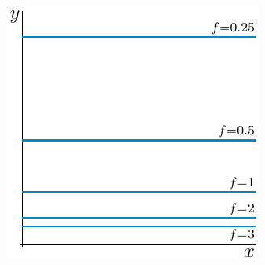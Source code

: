 \begin{answer}
\begin{center}
  \includegraphics{fig/hyperCylinderLevel.pdf}
\end{center}
\end{answer}


